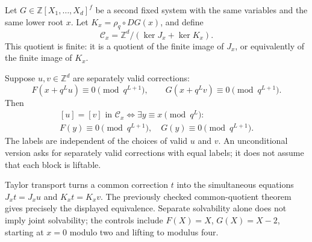 Let \(G\in\mathbb Z[X_1,\ldots,X_d]^f\) be a second fixed system with
the same variables and the same lower root \(x\). Let
\(K_x=\rho_q\circ DG(x)\), and define \[
\mathcal C_x=\mathbb Z^d/(\ker J_x+\ker K_x).
\] This quotient is finite: it is a quotient of the finite image of
\(J_x\), or equivalently of the finite image of \(K_x\).

Suppose \(u,v\in\mathbb Z^d\) are separately valid corrections: \[
F(x+q^Lu)\equiv0\pmod{q^{L+1}},
\qquad
G(x+q^Lv)\equiv0\pmod{q^{L+1}}.
\] Then \[
\boxed{
\begin{gathered}
[u]=[v]\text{ in }\mathcal C_x
\iff
\exists y\equiv x\pmod{q^L}:\\
F(y)\equiv0\pmod{q^{L+1}},\quad G(y)\equiv0\pmod{q^{L+1}}.
\end{gathered}
}
\] The labels are independent of the choices of valid \(u\) and \(v\).
An unconditional version asks for separately valid corrections with
equal labels; it does not assume that each block is liftable.

Taylor transport turns a common correction \(t\) into the simultaneous
equations \(J_xt=J_xu\) and \(K_xt=K_xv\). The previously checked
common-quotient theorem gives precisely the displayed equivalence.
Separate solvability alone does not imply joint solvability; the
controls include \(F(X)=X\), \(G(X)=X-2\), starting at \(x=0\) modulo
two and lifting to modulus four.
